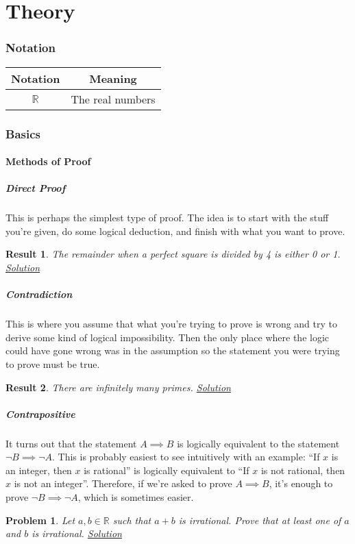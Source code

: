 \documentclass{amsart}
\newtheorem{problem}{Problem}[subsubsection]
\newtheorem{result}{Result}[subsubsection]
\newcommand{\Rr}{\mathbb{R}}
\begin{document}
\part{Theory}
\setcounter{section}{-1}
\section{Notation}
\begin{center}
  \begin{tabular}{cc}
    \toprule
    Notation & Meaning \\ \midrule

    $\Rr$ & The real numbers \\

    \bottomrule
  \end{tabular}
\end{center}
\newpage
\section{Basics}
\subsection{Methods of Proof}
\subsubsection{Direct Proof}
This is perhaps the simplest type of proof. The idea is to start with the stuff
you're given, do some logical deduction, and finish with what you want to prove.
\begin{result}\label{r:b:m:1:1}
  The remainder when a perfect square is divided by 4 is either 0 or 1.
  \hyperlink{s:m:1:1}{Solution}
\end{result}
\subsubsection{Contradiction}
This is where you assume that what you're trying to prove is wrong and try to
derive some kind of logical impossibility. Then the only place where the logic
could have gone wrong was in the assumption so the statement you were trying to
prove must be true.
\begin{result}\label{r:b:m:2:1}
  There are infinitely many primes.
  \hyperlink{s:m:2:1}{Solution}
\end{result}
\subsubsection{Contrapositive}
It turns out that the statement $A\implies B$ is logically equivalent to the
statement $\neg B\implies\neg A$. This is probably easiest to see intuitively
with an example: ``If $x$ is an integer, then $x$ is rational'' is
logically equivalent to ``If $x$ is not rational, then $x$ is not an integer''.
Therefore, if we're asked to prove $A\implies B$, it's enough to
prove $\neg B\implies\neg A$, which is sometimes easier.
\begin{problem}\label{p:b:m:3:1}
  Let $a,b\in\Rr$ such that $a+b$ is irrational. Prove that at least one of $a$
  and $b$ is irrational.
  \hyperlink{s:m:3:1}{Solution}
\end{problem}
\end{document}
